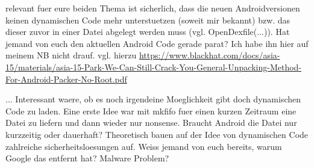relevant fuer eure beiden Thema ist sicherlich, dass die neuen Androidversionen keinen dynamischen Code mehr unterstuetzen (soweit mir bekannt) bzw. das dieser zuvor in einer Datei abgelegt werden muss (vgl. OpenDexfile(...)). Hat jemand von euch den aktuellen Android Code gerade parat? Ich habe ihn hier auf meinem NB nicht drauf.
vgl. hierzu
\url{https://www.blackhat.com/docs/asia-15/materials/asia-15-Park-We-Can-Still-Crack-You-General-Unpacking-Method-For-Android-Packer-No-Root.pdf}

... Interessant waere, ob es noch irgendeine Moeglichkeit gibt doch dynamischen Code zu laden. Eine erste Idee war mit mkfifo fuer einen kurzen Zeitraum eine Datei zu liefern und dann wieder nur nonsense. Braucht Android die Datei nur kurzzeitig oder dauerhaft? Theoretisch bauen auf der Idee von dynamischen Code zahlreiche sicherheitsloesungen auf. Weiss jemand von euch bereits, warum Google das entfernt hat? Malware Problem?
